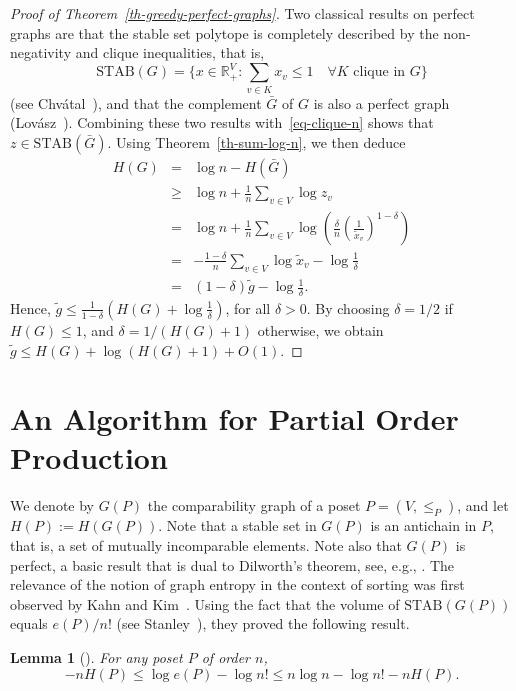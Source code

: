 \documentclass[12pt,oneside]{article}
\newtheorem{lemma}{Lemma}
\newcommand{\STAB}{\mathrm{STAB}}
\begin{document}
\begin{proof}[Proof of Theorem~\ref{th-greedy-perfect-graphs}]
Two classical results on perfect graphs are that the stable set polytope is completely described
by the non-negativity and clique inequalities, that is,
$$
\STAB(G) = \{x \in \mathbb{R}^V_+ : \sum_{v \in K} x_v \le 1\quad \forall K \textrm{ clique in } G\}
$$
(see Chv\'atal~\cite{C75}), and that the complement $\bar G$ of $G$ is also a
perfect graph (Lov\'asz~\cite{L72}). Combining these two results with~\eqref{eq-clique-n}
shows that $z \in \STAB(\bar G)$.
Using Theorem~\ref{th-sum-log-n}, we then deduce
\begin{eqnarray*}
H(G) &= & \log n - H(\bar G)\\
&\ge & \log n + \frac{1}{n}\sum_{v\in V}\log z_{v}\\
&= & \log n + \frac{1}{n}\sum_{v\in V}\log\left( \frac{\delta}{n} \left(\frac{1}{\tilde{x}_v}\right)^{1-\delta}\right)\\
&= &- \frac{1-\delta}{n} \sum_{v \in V} \log \tilde{x}_v - \log \frac{1}{\delta}\\
&= & (1-\delta) \tilde{g} - \log \frac{1}{\delta}.
\end{eqnarray*}
Hence, $\tilde{g} \leq \frac{1}{1-\delta} \left(H(G) + \log \frac{1}{\delta} \right)$, for all $\delta>0$.
By choosing $\delta = 1/2$ if $H(G)\leq 1$, and $\delta =1/(H(G) + 1)$ otherwise, we obtain
$\tilde{g} \leq H(G) + \log (H(G) + 1) + O(1)$.
\end{proof}

\section{An Algorithm for Partial Order Production}
\label{sec-algorithm}

We denote by $G(P)$ the comparability graph of a poset $P = (V,\leqslant_P)$, and let $H(P) := H(G(P))$. Note that a stable set in $G(P)$ is an antichain in $P$, that is, a set of mutually incomparable elements. Note also that $G(P)$ is perfect, a basic result that is dual to Dilworth's theorem, see, e.g., \cite{G04}. The relevance of the notion of graph entropy in the context of sorting was first observed by Kahn and Kim~\cite{KK95}. Using the fact that the volume of $\STAB(G(P))$ equals $e(P)/n!$ (see Stanley~\cite{S86}), they proved the following result.

\begin{lemma}[\hspace{-.01em}\cite{KK95}]
For any poset $P$ of order $n$,
\begin{equation*}
- nH(P) \le \log e(P) - \log n! \le n \log n - \log n! - n H(P).
\end{equation*}
\end{lemma}
\end{document}
